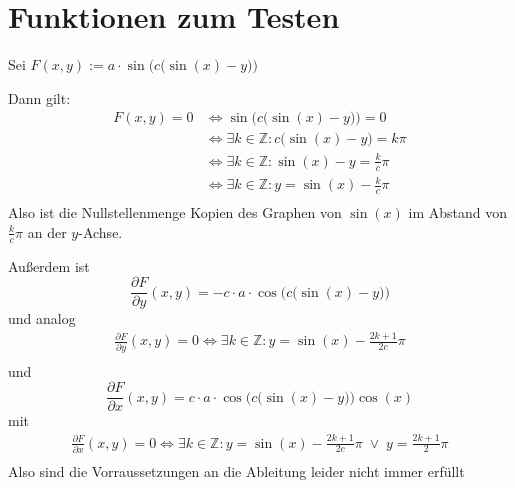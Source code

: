 \documentclass[a4paper]{article}
\theoremstyle{definition}
\newcommand{\Z}{\mathbb{Z}}
\begin{document}
\section{Funktionen zum Testen}

Sei $F(x,y) := a \cdot \sin \Big(c \big( \sin(x) -y \big)\Big) $

Dann gilt:
\begin{align*}
F(x,y)=0 &\iff \sin \Big(c \big( \sin(x) -y \big)\Big) = 0 \\
&\iff \exists k \in \Z :  c \big( \sin(x) -y \big) = k \pi \\
&\iff \exists k \in \Z :   \sin(x) -y  = \frac{k}{c} \pi \\
&\iff \exists k \in \Z :    y  = \sin(x) -\frac{k}{c} \pi \\
\end{align*}
Also ist die Nullstellenmenge Kopien des Graphen von $\sin(x)$ im Abstand von $\frac{k}{c} \pi$ an der $y$-Achse.

Außerdem ist
\[
\frac{\partial F}{\partial y}(x,y) =  -c\cdot a \cdot\cos \Big(c \big( \sin(x) -y \big)\Big)
\]
und analog
\begin{align*}
\frac{\partial F}{\partial y}(x,y) =0 \iff \exists k \in \Z :    y  = \sin(x) -\frac{2k+1}{2c} \pi \\
\end{align*}
und 
\[
\frac{\partial F}{\partial x}(x,y) =  c \cdot a \cdot\cos \Big(c \big( \sin(x) -y \big)\Big) \cos(x)
\]
mit
\begin{align*}
\frac{\partial F}{\partial x}(x,y) =0 \iff \exists k \in \Z :    y  = \sin(x) -\frac{2k+1}{2c} \pi \;\lor\;  y= \frac{2k+1}{2} \pi\\
\end{align*}
Also sind die Vorraussetzungen an die Ableitung leider nicht immer erfüllt
\end{document}
